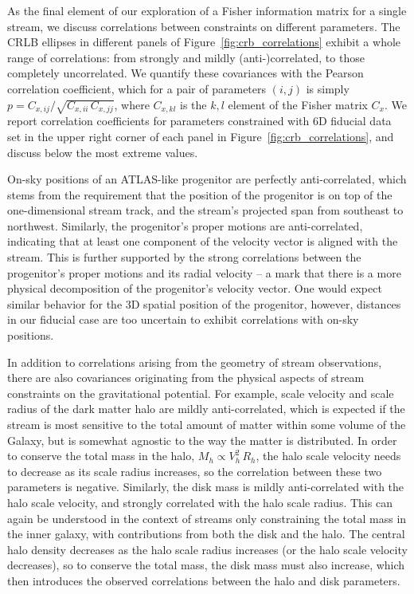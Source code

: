 \documentclass[modern]{aastex61}
\begin{document}
As the final element of our exploration of a Fisher information matrix for a single stream, we discuss correlations between constraints on different parameters.
The CRLB ellipses in different panels of Figure~\ref{fig:crb_correlations} exhibit a whole range of correlations: from strongly and mildly (anti-)correlated, to those completely uncorrelated.
We quantify these covariances with the Pearson correlation coefficient, which for a pair of parameters $(i,j)$ is simply $p = C_{x,ij} / \sqrt{C_{x,ii}\,C_{x,jj}}$, where $C_{x,kl}$ is the $k,l$ element of the Fisher matrix $C_x$.
We report correlation coefficients for parameters constrained with 6D fiducial data set in the upper right corner of each panel in Figure~\ref{fig:crb_correlations}, and discuss below the most extreme values.

On-sky positions of an ATLAS-like progenitor are perfectly anti-correlated, which stems from the requirement that the position of the progenitor is on top of the one-dimensional stream track, and the stream's projected span from southeast to northwest.
Similarly, the progenitor's proper motions are anti-correlated, indicating that at least one component of the velocity vector is aligned with the stream.
This is further supported by the strong correlations between the progenitor's proper motions and its radial velocity -- a mark that there is a more physical decomposition of the progenitor's velocity vector.
One would expect similar behavior for the 3D spatial position of the progenitor, however, distances in our fiducial case are too uncertain to exhibit correlations with on-sky positions.

In addition to correlations arising from the geometry of stream observations, there are also covariances originating from the physical aspects of stream constraints on the gravitational potential.
For example, scale velocity and scale radius of the dark matter halo are mildly anti-correlated, which is expected if the stream is most sensitive to the total amount of matter within some volume of the Galaxy, but is somewhat agnostic to the way the matter is distributed.
In order to conserve the total mass in the halo, $M_h \propto V_h^2\,R_h$, the halo scale velocity needs to decrease as its scale radius increases, so the correlation between these two parameters is negative.
Similarly, the disk mass is mildly anti-correlated with the halo scale velocity, and strongly correlated with the halo scale radius.
This can again be understood in the context of streams only constraining the total mass in the inner galaxy, with contributions from both the disk and the halo.
The central halo density decreases as the halo scale radius increases (or the halo scale velocity decreases), so to conserve the total mass, the disk mass must also increase, which then introduces the observed correlations between the halo and disk parameters. 
\end{document}

